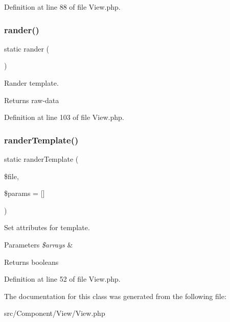 Definition at line 88 of file View.\+php.

\mbox{\label{class_zest_1_1_component_1_1_view_1_1_view_a169b39f53b8d8e35bd0c099da257322e}} 
\subsubsection{\texorpdfstring{rander()}{rander()}}
{\footnotesize\ttfamily static rander (\begin{DoxyParamCaption}{ }\end{DoxyParamCaption})\hspace{0.3cm}{\ttfamily [static]}}

Rander template.

\begin{DoxyReturn}{Returns}
raw-\/data 
\end{DoxyReturn}


Definition at line 103 of file View.\+php.

\mbox{\label{class_zest_1_1_component_1_1_view_1_1_view_a9f3e0779913ae33f6f67726498e37815}} 
\subsubsection{\texorpdfstring{rander\+Template()}{randerTemplate()}}
{\footnotesize\ttfamily static rander\+Template (\begin{DoxyParamCaption}\item[{}]{\$file,  }\item[{}]{\$params = {\ttfamily \mbox{[}\mbox{]}} }\end{DoxyParamCaption})\hspace{0.3cm}{\ttfamily [static]}}

Set attributes for template.


\begin{DoxyParams}{Parameters}
{\em \$arrays} & \\
\hline
\end{DoxyParams}
\begin{DoxyReturn}{Returns}
booleans 
\end{DoxyReturn}


Definition at line 52 of file View.\+php.



The documentation for this class was generated from the following file\+:\begin{DoxyCompactItemize}
\item 
src/\+Component/\+View/View.\+php\end{DoxyCompactItemize}
